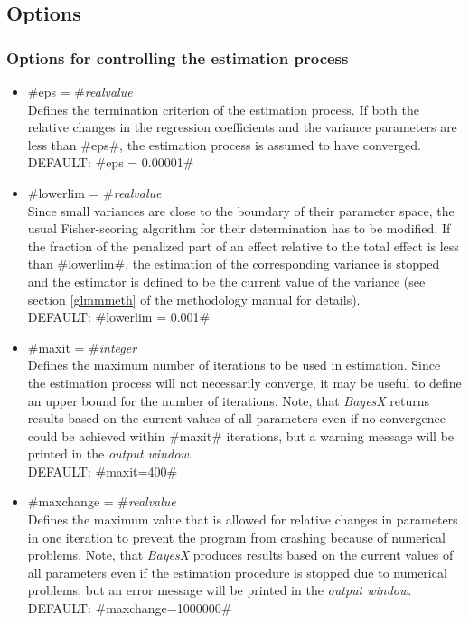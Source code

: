 \subsection{Options}
\label{remlregregressoptions}

\subsubsection*{Options for controlling the estimation process}
\label{remlest_options}

\begin{itemize}
\item #eps = #{\em realvalue } \\
Defines the termination criterion of the estimation process. If both
the relative changes in the regression coefficients and the variance
parameters are less than #eps#, the estimation process is
assumed to have converged.\\
DEFAULT: #eps = 0.00001#

\item #lowerlim = #{\em realvalue } \\
Since small variances are close to the boundary of their parameter
space, the usual Fisher-scoring algorithm for their determination
has to be modified. If the fraction of the penalized part of an
effect relative to the total effect is less than #lowerlim#, the
estimation of the corresponding variance is stopped and the
estimator is defined to be the current value of the variance (see
section \ref*{glmmmeth} of the methodology manual for details).\\
DEFAULT: #lowerlim = 0.001#

\item #maxit = #{\em integer } \\
Defines the maximum number of iterations to be used in estimation.
Since the estimation process will not necessarily converge, it may
be useful to define an upper bound for the number of iterations.
Note, that {\it BayesX} returns results based on the current values
of all parameters even if no convergence could be achieved within
#maxit# iterations, but a warning message will be printed
in the {\it output window}.\\
DEFAULT: #maxit=400#

\item #maxchange = #{\em realvalue } \\
Defines the maximum value that is allowed for relative changes in
parameters in one iteration to prevent the program from crashing
because of numerical problems. Note, that {\it BayesX} produces
results based on the current values of all parameters even if the
estimation procedure is stopped due to numerical problems, but an
error message will be printed in the {\it output window}.\\
DEFAULT: #maxchange=1000000#
\end{itemize}

